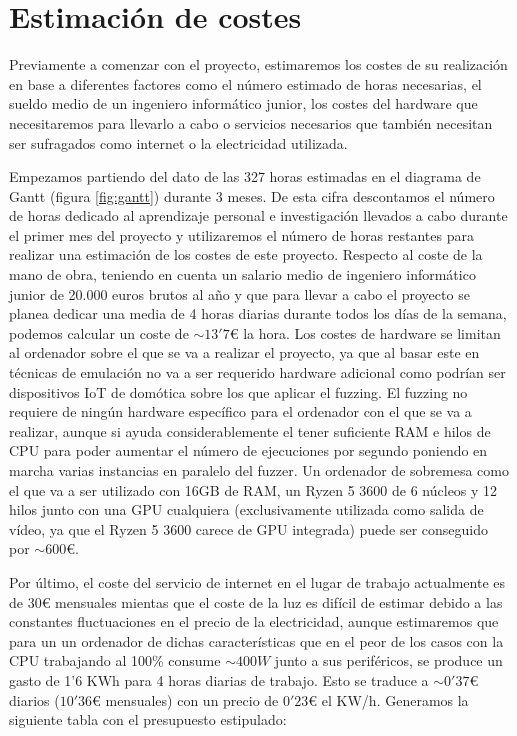 \section{Estimación de costes}
Previamente a comenzar con el proyecto, estimaremos los costes de su realización en base a diferentes factores como el número estimado de horas necesarias, el sueldo medio de un ingeniero informático junior, los costes del hardware que necesitaremos para llevarlo a cabo o servicios necesarios
que también necesitan ser sufragados como internet o la electricidad utilizada.\bigskip

Empezamos partiendo del dato de las 327 horas estimadas en el diagrama de Gantt (figura \ref{fig:gantt}) durante 3 meses.
De esta cifra descontamos el número de horas dedicado al aprendizaje personal e investigación llevados a cabo durante el primer mes del
proyecto y utilizaremos el número de horas restantes para realizar una estimación de los costes de este proyecto. Respecto al coste de la 
mano de obra, teniendo en cuenta un 
salario medio de ingeniero informático junior de 20.000 euros brutos al año y que para llevar a cabo el proyecto se planea dedicar una media de 
4 horas diarias durante todos los días de la semana, podemos calcular un coste de $\sim13'7\euro$ la hora. Los costes de hardware se limitan al
ordenador sobre el que se va a realizar el proyecto, ya que al basar este en técnicas de emulación no va a ser requerido hardware adicional 
como podrían ser dispositivos IoT de domótica sobre los que aplicar el fuzzing. El fuzzing no requiere de ningún hardware específico para el 
ordenador con el que se va a realizar, aunque si ayuda considerablemente el tener suficiente RAM e hilos de CPU para poder aumentar el número de ejecuciones por segundo 
poniendo en marcha varias instancias en paralelo del fuzzer. Un ordenador de sobremesa como el que va a ser utilizado con 16GB de RAM, un 
Ryzen 5 3600 de 6 núcleos y 12 hilos junto con una GPU cualquiera (exclusivamente utilizada como salida de vídeo, ya que el Ryzen 5 3600 carece de GPU integrada) puede ser
conseguido por $\sim600\euro$.\bigskip

Por último, el coste del servicio de internet en el lugar de trabajo actualmente es de $30\euro$ mensuales mientas 
que el coste de la luz es difícil de estimar debido a las constantes fluctuaciones en el precio de la electricidad, aunque estimaremos que 
para un un ordenador de dichas características que en el peor de los casos con la CPU trabajando al 100\% consume $\sim400W$ junto a sus 
periféricos, se produce un gasto de 1'6 KWh para 4 horas diarias de trabajo. Esto se traduce a $\sim0'37\euro$ diarios ($10'36\euro$ mensuales)
con un precio de $0'23\euro$ el KW/h. Generamos la siguiente tabla con el presupuesto estipulado:

